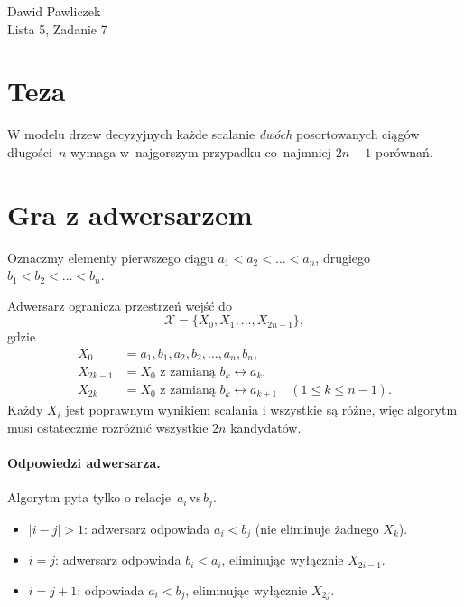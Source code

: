 \documentclass[11pt,a4paper]{article}
\begin{document}
\begin{center}
\Large Dawid Pawliczek\\
Lista 5, Zadanie 7
\end{center}

\bigskip
\section*{Teza}

W modelu drzew decyzyjnych każde scalanie
\emph{dwóch} posortowanych ciągów długości~$n$
wymaga w~najgorszym przypadku
co~najmniej $2n-1$ porównań.

\section*{Gra z adwersarzem}

Oznaczmy elementy pierwszego ciągu
\(a_1<a_2<\dots<a_n\),
drugiego
\(b_1<b_2<\dots<b_n\).

Adwersarz ogranicza przestrzeń wejść do
\[
  \mathcal X=\{X_0,X_1,\dots,X_{2n-1}\},
\]
gdzie
\[
\begin{aligned}
X_0      &= a_1,b_1,a_2,b_2,\dots,a_n,b_n,\\
X_{2k-1} &= X_0 \text{ z zamianą } b_k\!\leftrightarrow a_k,\\
X_{2k}   &= X_0 \text{ z zamianą } b_k\!\leftrightarrow a_{k+1}
           \quad(1\le k\le n-1).
\end{aligned}
\]
Każdy $X_i$ jest poprawnym wynikiem scalania
i wszystkie są różne, więc algorytm
musi ostatecznie rozróżnić wszystkie $2n$ kandydatów.

\paragraph{Odpowiedzi adwersarza.}
Algorytm pyta tylko o relacje \(\,a_i\,\text{vs}\,b_j\).

\begin{itemize}
\item $|i-j|>1$: adwersarz odpowiada $a_i<b_j$
      (nie eliminuje żadnego $X_k$).
\item $i=j$:      adwersarz odpowiada $b_i<a_i$,
      eliminując wyłącznie $X_{2i-1}$.
\item $i=j+1$:    odpowiada $a_i<b_j$,
      eliminując wyłącznie $X_{2j}$.
\end{itemize}
\end{document}
